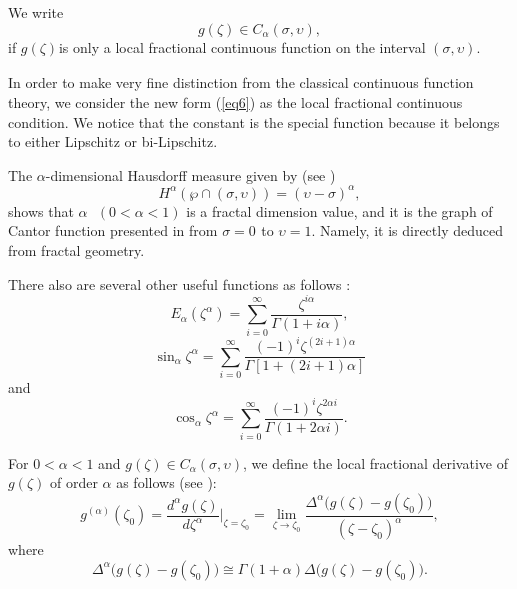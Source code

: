 \documentclass[10pt]{NSP1}
\begin{document}
We write
\begin{equation}
\label{eq8}
g\left( \zeta \right)\in C_\alpha \left( {\sigma ,\upsilon } \right),
\end{equation}
if $g\left( \zeta \right)_{ }$is only a local fractional continuous
function on the interval $\left( {\sigma ,\upsilon } \right)$.

In order to make very fine distinction from the classical continuous function theory,
we consider the new form (\ref{eq6}) as the local fractional continuous condition.
We notice that the constant is the special function because it belongs to
either Lipschitz or bi-Lipschitz.

The $\alpha$-dimensional Hausdorff measure given by (see \cite{41})
\begin{equation}
\label{eq9}
H^\alpha \left( {\wp \cap \left( {\sigma ,\upsilon } \right)} \right)=\left(
{\upsilon -\sigma } \right)^\alpha ,
\end{equation}
shows that $\alpha \mbox{ }\left( {0<\alpha <1} \right)$ is a fractal
dimension value, and it is the graph of Cantor function presented in \cite {42}
from $\sigma =0_{ }$ to $\upsilon =1$. Namely, it is directly deduced from
fractal geometry.

There also are several other useful functions as follows \cite {41}:
\begin{equation}
\label{eq10}
E_\alpha \left( {\zeta ^\alpha } \right)=\sum\limits_{i=0}^\infty
{\frac{\zeta ^{i\alpha }}{\Gamma \left( {1+i\alpha } \right)}} ,
\end{equation}
\begin{equation}
\label{eq11}
\sin _\alpha \zeta ^\alpha =\sum\limits_{i=0}^\infty {\frac{\left( {-1}
\right)^i\zeta ^{(2i+1)\alpha }}{\Gamma \left[ {1+\left( {2i+1}
\right)\alpha } \right]}}
\end{equation}
and
\begin{equation}
\label{eq12}
\cos _\alpha \zeta ^\alpha =\sum\limits_{i=0}^\infty {\frac{\left( {-1}
\right)^i\zeta ^{2\alpha i}}{\Gamma \left( {1+2\alpha i} \right)}} .
\end{equation}

For $0<\alpha <1$ and $g\left( \zeta \right)\in C_\alpha \left( {\sigma
,\upsilon } \right)$, we define the local fractional derivative of $g\left(
\zeta \right)$ of order $\alpha$ as follows (see \cite {22,23,35,36,37,38,39,40,41}):
\begin{equation}
\label{eq13}
g^{\left( \alpha \right)}\left( {\zeta _0 } \right)=\frac{d^\alpha g\left(
\zeta \right)}{d\zeta ^\alpha }\bigg|_{\zeta =\zeta_0}=\mathop
{\lim }\limits_{\zeta \to \zeta _0 } \frac{\Delta ^\alpha \big( {g\left(
\zeta \right)-g\left( {\zeta _0 } \right)} \big)}{\left( {\zeta -\zeta _0
} \right)^\alpha },
\end{equation}
where
$$\Delta ^\alpha \big( {g\left( \zeta \right)-g\left( {\zeta _0 }
\right)} \big)\cong \Gamma \left( {1+\alpha } \right)\Delta \big(
{g\left(\zeta \right)-g\left({\zeta_0} \right)} \big).$$
\end{document}
